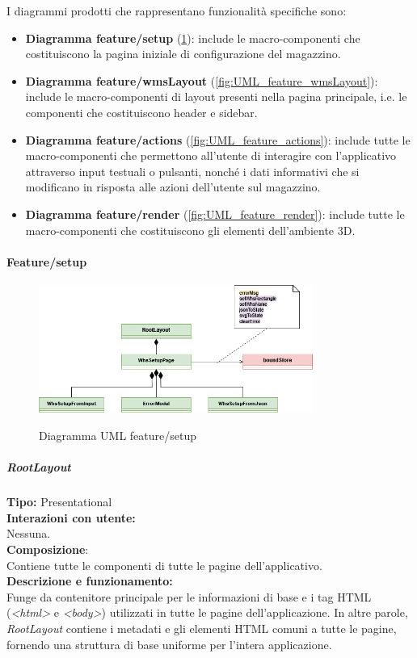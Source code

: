 I diagrammi prodotti che rappresentano funzionalità specifiche sono:
\begin{itemize}
    \item \textbf{Diagramma feature/setup} (\ref{fig:UML_feature_setup}): include le macro-componenti che costituiscono la pagina iniziale di configurazione del magazzino.
    \item \textbf{Diagramma feature/wmsLayout} (\ref{fig:UML_feature_wmsLayout}): include le macro-componenti di layout presenti nella pagina principale, i.e. le componenti che costituiscono header e sidebar.
    \item \textbf{Diagramma feature/actions} (\ref{fig:UML_feature_actions}): include tutte le macro-componenti che permettono all'utente di interagire con l'applicativo attraverso input testuali o pulsanti, nonché i dati informativi che si modificano in risposta alle azioni dell'utente sul magazzino.
    \item \textbf{Diagramma feature/render} (\ref{fig:UML_feature_render}): include tutte le macro-componenti che costituiscono gli elementi dell'ambiente 3D.
\end{itemize}


\paragraph{Feature/setup}
\begin{figure}[H]
    \centering
    \includegraphics[width=0.8\textwidth]{images/UML/feature_setup.drawio.png}
    \label{fig:UML_feature_setup}
    \caption{Diagramma UML feature/setup}
\end{figure}

\subparagraph{\colorbox{verde_uml}{RootLayout}} \label{rootlayout}
\textbf{Tipo:} Presentational \\
\textbf{Interazioni con utente:} \\
Nessuna. \\
\textbf{Composizione}: \\
Contiene tutte le componenti di tutte le pagine dell'applicativo. \\
\textbf{Descrizione e funzionamento:} \\
Funge da contenitore principale per le informazioni di base e i tag HTML (\textit{\textless html\textgreater } e \textit{\textless body\textgreater }) utilizzati in tutte le pagine dell'applicazione. In altre parole, \textit{RootLayout }contiene i metadati e gli elementi HTML comuni a tutte le pagine, fornendo una struttura di base uniforme per l'intera applicazione. 

